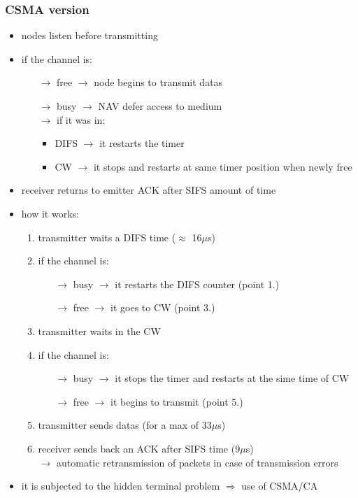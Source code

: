 \subsubsection{CSMA version}
\begin{itemize}
    \item nodes listen before transmitting
    \item if the channel is:
    \begin{itemize}
        \item[$\rightarrow$] free $\rightarrow$ node begins to transmit datas
        \item[$\rightarrow$] busy $\rightarrow$ NAV defer access to medium\\
        \hspace*{0.75cm}$\rightarrow$ if it was in:
        \begin{itemize}
            \item DIFS $\rightarrow$ it restarts the timer
            \item CW $\rightarrow$ it stops and restarts at same timer position when newly free
        \end{itemize}
    \end{itemize}
    \item receiver returns to emitter ACK after SIFS amount of time
    \item how it works:
    \begin{enumerate}
        \item transmitter waits a DIFS time ($\approx$ 16$\mu$s)
        \item if the channel is:
        \begin{itemize}
            \item[$\rightarrow$] busy $\rightarrow$ it restarts the DIFS counter (point 1.)
            \item[$\rightarrow$] free $\rightarrow$ it goes to CW (point 3.)
        \end{itemize}
        \item transmitter waits in the CW
        \item if the channel is:
        \begin{itemize}
            \item[$\rightarrow$] busy $\rightarrow$ it stops the timer and restarts at the sime time of CW
            \item[$\rightarrow$] free $\rightarrow$ it begins to transmit (point 5.)
        \end{itemize}
        \item transmitter sends datas (for a max of 33$\mu$s)
        \item receiver sends back an ACK after SIFS time (9$\mu$s)\\
        $\rightarrow$ automatic retransmission of packets in case of transmission errors
    \end{enumerate}
    \item it is subjected to the hidden terminal problem $\Rightarrow$ use of CSMA/CA
\end{itemize}
